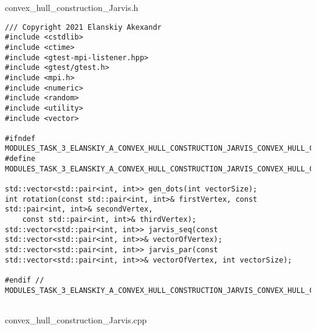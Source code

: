 \documentclass{report}
\begin{document}
convex\_hull\_construction\_Jarvis.h
\begin{lstlisting}
/// Copyright 2021 Elanskiy Akexandr
#include <cstdlib>
#include <ctime>
#include <gtest-mpi-listener.hpp>
#include <gtest/gtest.h>
#include <mpi.h>
#include <numeric>
#include <random>
#include <utility>
#include <vector>

#ifndef MODULES_TASK_3_ELANSKIY_A_CONVEX_HULL_CONSTRUCTION_JARVIS_CONVEX_HULL_CONSTRUCTION_JARVIS_H_
#define MODULES_TASK_3_ELANSKIY_A_CONVEX_HULL_CONSTRUCTION_JARVIS_CONVEX_HULL_CONSTRUCTION_JARVIS_H_

std::vector<std::pair<int, int>> gen_dots(int vectorSize);
int rotation(const std::pair<int, int>& firstVertex, const std::pair<int, int>& secondVertex,
    const std::pair<int, int>& thirdVertex);
std::vector<std::pair<int, int>> jarvis_seq(const std::vector<std::pair<int, int>>& vectorOfVertex);
std::vector<std::pair<int, int>> jarvis_par(const std::vector<std::pair<int, int>>& vectorOfVertex, int vectorSize);

#endif // MODULES_TASK_3_ELANSKIY_A_CONVEX_HULL_CONSTRUCTION_JARVIS_CONVEX_HULL_CONSTRUCTION_JARVIS_H_


\end{lstlisting}
convex\_hull\_construction\_Jarvis.cpp
\end{document}
